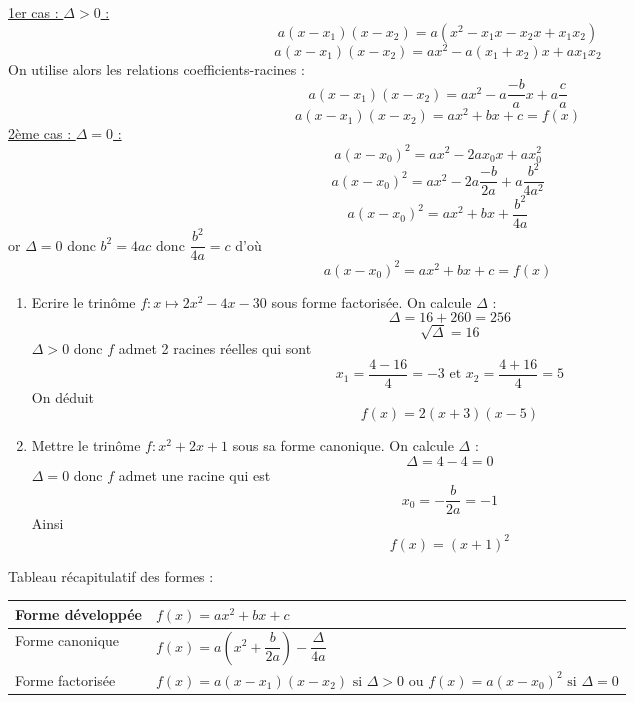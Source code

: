 \newline
\begin{preuve}
\newline\underline{1er cas : $\Delta > 0$ :} \newline
$$a(x-x_1)(x-x_2) = a(x^2 - x_1x - x_2x + x_1x_2)$$
$$a(x-x_1)(x-x_2) = ax^2 - a(x_1 + x_2)x + ax_1x_2$$
On utilise alors les relations coefficients-racines : 
$$a(x-x_1)(x-x_2) = ax^2 - a\dfrac{-b}{a}x + a \dfrac{c}{a} $$
$$a(x-x_1)(x-x_2) = ax^2+bx+c =f(x)$$
\newline\underline{2ème cas : $\Delta = 0$ :} \newline
$$a(x-x_0)^2 = ax^2 - 2ax_0x +ax_0^2$$
$$a(x-x_0)^2 = ax^2 -2a \dfrac{-b}{2a} + a \dfrac{b^2}{4a^2}$$
$$a(x-x_0)^2 = ax^2 +bx + \dfrac{b^2}{4a}$$
or $\Delta = 0$ donc $b^2 = 4ac$ donc $\dfrac{b^2}{4a} = c$ d'où
$$a(x-x_0)^2 = ax^2 + bx + c = f(x)$$
\end{preuve}
\begin{exemples}
\begin{enumerate}
\item Ecrire le trinôme $f:x\mapsto 2x^2-4x -30$ sous forme factorisée. On calcule $\Delta$ : 
$$\Delta = 16 +260 = 256$$
$$\sqrt{\Delta} = 16$$
$\Delta > 0$ donc $f$ admet 2 racines réelles qui sont 
$$x_1 = \dfrac{4-16}{4} = -3 \text{ et } x_2 = \dfrac{4+16}{4} = 5$$
On déduit 
$$f(x) = 2 (x+3)(x-5)$$
\item Mettre le trinôme $f:x^2+2x+1$ sous sa forme canonique. On calcule $\Delta$ : 
$$\Delta = 4-4 = 0$$
$\Delta = 0$ donc $f$ admet une racine qui est 
$$x_0 = -\dfrac{b}{2a} = -1$$
Ainsi 
$$f(x) = (x+1)^2$$
\end{enumerate}
\end{exemples}
Tableau récapitulatif des formes : \newline
\begin{tabularx}{\linewidth}{| l | X |}
\hline
   Forme développée & $f(x) = ax^2+bx+c$ \rule[-7pt]{0pt}{25pt} \\ \hline
   Forme canonique & $f(x) = a\left(x^2+\dfrac{b}{2a}\right) - \dfrac{\Delta}{4a}$ \rule[-7pt]{0pt}{25pt} \\ \hline
   Forme factorisée & $f(x) = a(x-x_1)(x-x_2) \text{ si } \Delta > 0 \text{ ou } f(x) = a(x-x_0)^2 \text{ si } \Delta = 0$ \rule[-7pt]{0pt}{25pt} \\ \hline
\end{tabularx}
